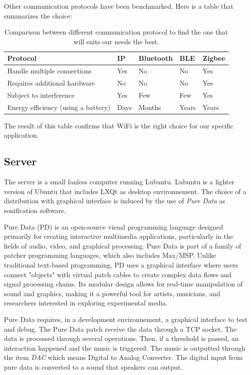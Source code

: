 Other communication protocols have been benchmarked. Here is a table that summarizes
the choice: 

\begin{table}[]
    \begin{tabular}{|l|l|l|l|l|}
    \hline
    Protocol                            & IP   & Bluetooth & BLE   & Zigbee \\ \hline
    Handle multiple connections         & Yes  & No        & No    & Yes    \\
    Requires additional hardware        & No   & No        & No    & Yes    \\
    Subject to interference             & Yes  & Few       & Few   & Yes    \\
    Energy efficiency (using a battery) & Days & Months    & Years & Years  \\ \hline
    \end{tabular}
    \caption{Comparison between different communication protocol to find the one that will suits our needs the best.}
    \label{tab:protocol_comparison}
\end{table}

The result of this table confirms that WiFi is the right choice for our specific application.
\subsection{Server}

The server is a small fanless computer running Lubuntu. Lubuntu is a lighter version of Ubuntu
that includes LXQt as desktop environnement. The choice of a distribution with graphical
interface is induced by the use of \textit{Pure Data} as sonification software.

Pure Data (PD) is an open-source visual programming language designed primarily for 
creating interactive multimedia applications, particularly in the fields of audio, video, 
and graphical processing.
Pure Data is part of a family of patcher programming languages, which also includes Max/MSP.
Unlike traditional text-based programming, PD uses a graphical interface where users connect 
"objects" with virtual patch cables to create complex data flows and signal processing chains. 
Its modular design allows for real-time manipulation of sound and graphics, making it a powerful 
tool for artists, musicians, and researchers interested in exploring experimental media. 

Pure Data requires, in a development environnement, a graphical interface to test and debug.
The Pure Data patch receive the data through a TCP socket. The data is processed through several 
operations. Then, if a threshold is passed, an interaction happened and the music is triggered.
The music is outputted through the item \textit{DAC} which means Digital to Analog Converter. 
The digital input from pure data is converted to a sound that speakers can output.

